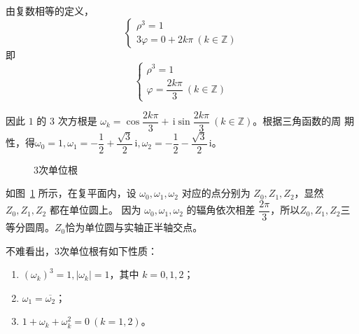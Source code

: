 \documentclass[a4paper,openany]{ctexbook}
\newcommand{\ii}{\,\mathrm{i}}
\begin{document}
由复数相等的定义，
\[
    \begin{cases}
        \rho ^3=1 \\
        3 \varphi =0+2k \pi \ (k \in \mathbb{Z} )
    \end{cases}
\]
即
\[
    \begin{cases}
        \rho ^3=1 \\
        \varphi=\dfrac{2k \pi }{3} \ (k \in \mathbb{Z} )
    \end{cases}
\]

因此 \(1\) 的 \(3\) 次方根是 \(\omega_k=\cos \dfrac{2k \pi }{3}+\ii \sin \dfrac{2k \pi }{3}\ (k \in \mathbb{Z} )\)。根据三角函数的周
期性，得\(\omega_0=1,\omega_1=-\dfrac{1}{2}+\dfrac{\sqrt{3}}{2}\ii,\omega_2=-\dfrac{1}{2}-\dfrac{\sqrt{3}}{2}\ii\)。

\begin{figure}
    \centering
    \caption{\(3\)次单位根}\label{fgr:3cidjwwgf}
\end{figure}

如图~\ref{fgr:3cidjwwgf} 所示，在复平面内，设 \(\omega_0,\omega_1,\omega_2\) 对应的点分别为 \(Z_0,Z_1,Z_2\)，显然 \(Z_0,Z_1,Z_2\) 都在单位圆上。
因为 \(\omega_0,\omega_1,\omega_2\) 的辐角依次相差 \(\dfrac{2 \pi }{3}\)，所以\(Z_0,Z_1,Z_2\)三等分圆周。\(Z_0\)恰为单位圆与实轴正半轴交点。

不难看出，\(3\)次单位根有如下性质：

\begin{enumerate}
    \item \((\omega_k)^3=1,|\omega_k|=1\)，其中 \(k=0,1,2\)；
    \item \(\omega_1=\overline{\omega_2}\)；
    \item \(1+\omega_k+\omega_k^2=0 \ (k=1,2)\)。
\end{enumerate}
\end{document}
